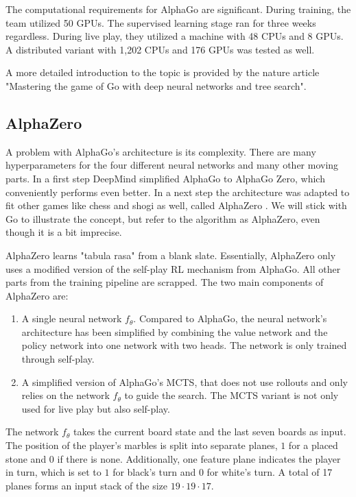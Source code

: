 The computational requirements for AlphaGo are significant. During training, the team utilized 50 GPUs. The supervised learning stage ran for three weeks regardless. During live play, they utilized a machine with 48 CPUs and 8 GPUs. A distributed variant with 1,202 CPUs and 176 GPUs was tested as well.

A more detailed introduction to the topic is provided by the nature article "Mastering the game of Go with deep neural networks and tree search". \cite{silver_mastering_2016}

\subsection{AlphaZero}
A problem with AlphaGo's architecture is its complexity. There are many hyperparameters for the four different neural networks and many other moving parts. In a first step DeepMind simplified AlphaGo to AlphaGo Zero, which conveniently performs even better. In a next step the architecture was adapted to fit other games like chess and shogi as well, called AlphaZero \cite{silver_mastering_2017-1}. We will stick with Go to illustrate the concept, but refer to the algorithm as AlphaZero, even though it is a bit imprecise.

AlphaZero learns "tabula rasa" from a blank slate. Essentially, AlphaZero only uses a modified version of the self-play RL mechanism from AlphaGo. All other parts from the training pipeline are scrapped. The two main components of AlphaZero are:

\begin{enumerate}
    \item A single neural network $f_{\theta}$. Compared to AlphaGo, the neural network's architecture has been simplified by combining the value network and the policy network into one network with two heads. The network is only trained through self-play.
    \item A simplified version of AlphaGo's MCTS, that does not use rollouts and only relies on the network $f_{\theta}$ to guide the search. The MCTS variant is not only used for live play but also self-play.
\end{enumerate}

The network $f_{\theta}$ takes the current board state and the last seven boards as input. The position of the player's marbles is split into separate planes, $1$ for a placed stone and $0$ if there is none. Additionally, one feature plane indicates the player in turn, which is set to $1$ for black's turn and $0$ for white's turn. A total of 17 planes forms an input stack of the size $19 \cdot 19 \cdot 17$.

